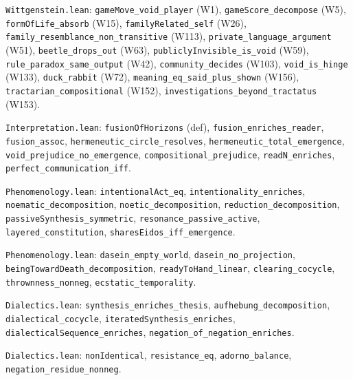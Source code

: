 \documentclass[11pt,oneside]{book}
\theoremstyle{plain}
\theoremstyle{definition}
\theoremstyle{remark}
\begin{document}
\begin{description}[style=nextline]
\item[Wittgenstein]
  \texttt{Wittgenstein.lean}: \texttt{gameMove\_void\_player} (W1),
  \texttt{gameScore\_decompose} (W5),
  \texttt{formOfLife\_absorb} (W15),
  \texttt{familyRelated\_self} (W26),
  \texttt{family\_resemblance\_non\_transitive} (W113),
  \texttt{private\_language\_argument} (W51),
  \texttt{beetle\_drops\_out} (W63),
  \texttt{publiclyInvisible\_is\_void} (W59),
  \texttt{rule\_paradox\_same\_output} (W42),
  \texttt{community\_decides} (W103),
  \texttt{void\_is\_hinge} (W133),
  \texttt{duck\_rabbit} (W72),
  \texttt{meaning\_eq\_said\_plus\_shown} (W156),
  \texttt{tractarian\_compositional} (W152),
  \texttt{investigations\_beyond\_tractatus} (W153).

\item[Gadamer]
  \texttt{Interpretation.lean}: \texttt{fusionOfHorizons} (def),
  \texttt{fusion\_enriches\_reader},
  \texttt{fusion\_assoc},
  \texttt{hermeneutic\_circle\_resolves},
  \texttt{hermeneutic\_total\_emergence},
  \texttt{void\_prejudice\_no\_emergence},
  \texttt{compositional\_prejudice},
  \texttt{readN\_enriches},
  \texttt{perfect\_communication\_iff}.

\item[Husserl]
  \texttt{Phenomenology.lean}: \texttt{intentionalAct\_eq},
  \texttt{intentionality\_enriches},
  \texttt{noematic\_decomposition},
  \texttt{noetic\_decomposition},
  \texttt{reduction\_decomposition},
  \texttt{passiveSynthesis\_symmetric},
  \texttt{resonance\_passive\_active},
  \texttt{layered\_constitution},
  \texttt{sharesEidos\_iff\_emergence}.

\item[Heidegger]
  \texttt{Phenomenology.lean}: \texttt{dasein\_empty\_world},
  \texttt{dasein\_no\_projection},
  \texttt{beingTowardDeath\_decomposition},
  \texttt{readyToHand\_linear},
  \texttt{clearing\_cocycle},
  \texttt{thrownness\_nonneg},
  \texttt{ecstatic\_temporality}.

\item[Hegel]
  \texttt{Dialectics.lean}: \texttt{synthesis\_enriches\_thesis},
  \texttt{aufhebung\_decomposition},
  \texttt{dialectical\_cocycle},
  \texttt{iteratedSynthesis\_enriches},
  \texttt{dialecticalSequence\_enriches},
  \texttt{negation\_of\_negation\_enriches}.

\item[Adorno]
  \texttt{Dialectics.lean}: \texttt{nonIdentical},
  \texttt{resistance\_eq},
  \texttt{adorno\_balance},
  \texttt{negation\_residue\_nonneg}.


\end{description}
\end{document}
